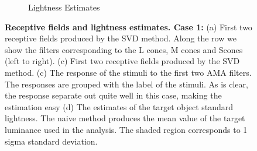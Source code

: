 \documentclass{jov}
\begin{document}
\begin{figure}
\begin{subfigure}[b]{0.20 \textwidth}
        \caption{Lightness Estimates}
        \label{fig:case9Results}
    \end{subfigure}    
    \caption{{\bf Receptive fields and lightness estimates. Case 1:} (a) First two receptive fields produced by the SVD method. Along the row we show the filters corresponding to the L cones, M cones and Scones (left to right). (c) First two receptive fields produced by the SVD method. (c) The response of the stimuli to the first two AMA filters. The responses are grouped with the label of the stimuli. As is clear, the response separate out quite well in this case, making the estimation easy (d) The estimates of the target object standard lightness. The naive method produces the mean value of the target luminance used in the analysis. The shaded region corresponds to 1 sigma standard deviation.}
\label{fig:case9AllResults}
\end{figure}
\end{document}
